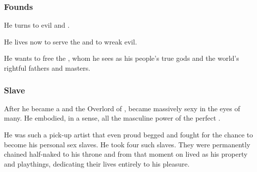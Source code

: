\subsubsection{Founds \Mystraacht}
He turns to evil and . 


He lives now to serve the \banes{} and to wreak evil. 
  

He wants to free the \banes{}, whom he sees as his people's true gods and the world's rightful fathers and masters. 
  





\subsubsection{Slave \resviel}
After he became a \sathariah{} and the Overlord of \Mystraacht, \Zachirah{} became massively sexy in the eyes of many. 
He embodied, in a sense, all the masculine power of the perfect \resphan. 

He was such a pick-up artist that even proud \resviel{} begged and fought for the chance to become his personal sex slaves. 
He took four such slaves. 
They were permanently chained half-naked to his throne and from that moment on lived as his property and playthings, dedicating their lives entirely to his pleasure. 

